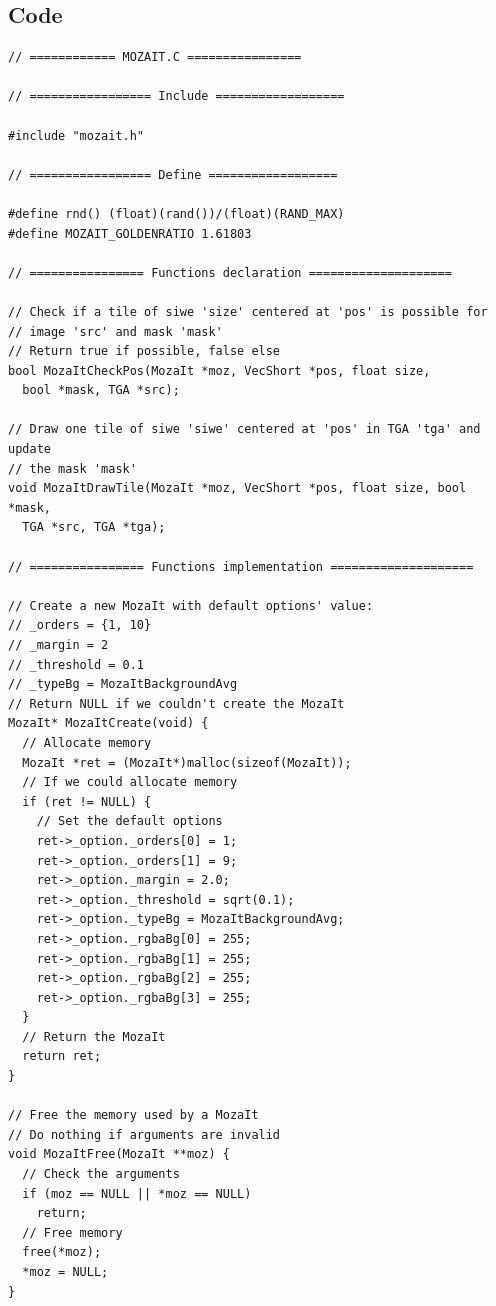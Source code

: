 \documentclass[12pt, a4paper]{article}
\begin{document}
\subsection{Code}

\begin{scriptsize}
\begin{ttfamily}
\begin{lstlisting}
// ============ MOZAIT.C ================

// ================= Include ==================

#include "mozait.h"

// ================= Define ==================

#define rnd() (float)(rand())/(float)(RAND_MAX)
#define MOZAIT_GOLDENRATIO 1.61803

// ================ Functions declaration ====================

// Check if a tile of siwe 'size' centered at 'pos' is possible for 
// image 'src' and mask 'mask'
// Return true if possible, false else
bool MozaItCheckPos(MozaIt *moz, VecShort *pos, float size, 
  bool *mask, TGA *src);

// Draw one tile of siwe 'siwe' centered at 'pos' in TGA 'tga' and update
// the mask 'mask'
void MozaItDrawTile(MozaIt *moz, VecShort *pos, float size, bool *mask, 
  TGA *src, TGA *tga);
  
// ================ Functions implementation ====================

// Create a new MozaIt with default options' value:
// _orders = {1, 10}
// _margin = 2
// _threshold = 0.1
// _typeBg = MozaItBackgroundAvg
// Return NULL if we couldn't create the MozaIt
MozaIt* MozaItCreate(void) {
  // Allocate memory
  MozaIt *ret = (MozaIt*)malloc(sizeof(MozaIt));
  // If we could allocate memory
  if (ret != NULL) {
    // Set the default options
    ret->_option._orders[0] = 1;
    ret->_option._orders[1] = 9;
    ret->_option._margin = 2.0;
    ret->_option._threshold = sqrt(0.1);
    ret->_option._typeBg = MozaItBackgroundAvg;
    ret->_option._rgbaBg[0] = 255;
    ret->_option._rgbaBg[1] = 255;
    ret->_option._rgbaBg[2] = 255;
    ret->_option._rgbaBg[3] = 255;
  }
  // Return the MozaIt
  return ret;
}

// Free the memory used by a MozaIt
// Do nothing if arguments are invalid
void MozaItFree(MozaIt **moz) {
  // Check the arguments
  if (moz == NULL || *moz == NULL)
    return;
  // Free memory
  free(*moz);
  *moz = NULL;
}


\end{lstlisting}
\end{ttfamily}
\end{scriptsize}
\end{document}
